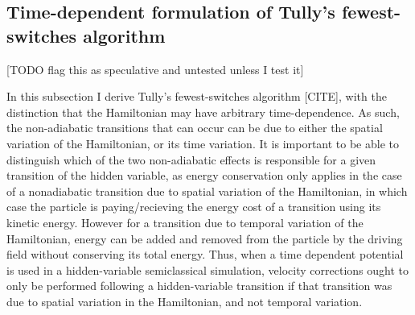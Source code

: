 \subsection{Time-dependent formulation of Tully's fewest-switches algorithm}

[TODO flag this as speculative and untested unless I test it]

In this subsection I derive Tully's fewest-switches algorithm [CITE], with the distinction that the Hamiltonian may have arbitrary time-dependence. As such, the non-adiabatic transitions that can occur can be due to either the spatial variation of the Hamiltonian, or its time variation. It is important to be able to distinguish which of the two non-adiabatic effects is responsible for a given transition of the hidden variable, as energy conservation only applies in the case of a nonadiabatic transition due to spatial variation of the Hamiltonian, in which case the particle is paying/recieving the energy cost of a transition using its kinetic energy. However for a transition due to temporal variation of the Hamiltonian, energy can be added and removed from the particle by the driving field without conserving its total energy. Thus, when a time dependent potential is used in a hidden-variable semiclassical simulation, velocity corrections ought to only be performed following a hidden-variable transition if that transition was due to spatial variation in the Hamiltonian, and not temporal variation. 

